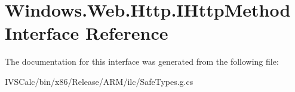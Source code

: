 \hypertarget{interface_windows_1_1_web_1_1_http_1_1_i_http_method}{}\section{Windows.\+Web.\+Http.\+I\+Http\+Method Interface Reference}
\label{interface_windows_1_1_web_1_1_http_1_1_i_http_method}


The documentation for this interface was generated from the following file\+:\begin{DoxyCompactItemize}
\item 
I\+V\+S\+Calc/bin/x86/\+Release/\+A\+R\+M/ilc/Safe\+Types.\+g.\+cs\end{DoxyCompactItemize}
